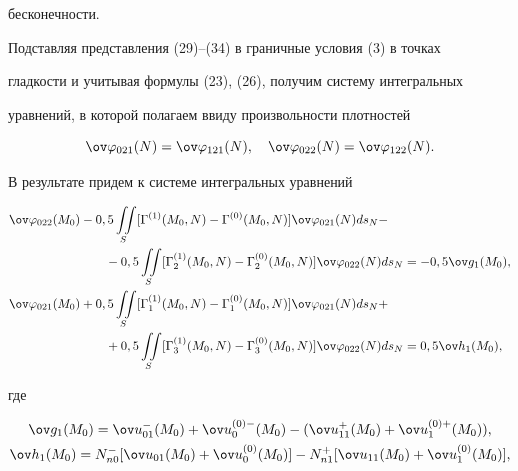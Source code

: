 \begin{pf}
бесконечности. 


 


Подставляя представления (29)--(34) в граничные условия (3) в точках  


гладкости и учитывая формулы (23), (26), получим систему интегральных  


уравнений, в которой полагаем ввиду произвольности плотностей 


$$ 


\ov\varphi_{021}(N)=\ov\varphi_{121}(N),\quad 


\ov\varphi_{022}(N)=\ov\varphi_{122}(N). 


$$ 


В результате придем к системе интегральных уравнений 


\begin{align} 


\ov\varphi_{022}(M_0)&-0,5\iint\limits_S[\Gamma^{(1)}(M_0,N)- 


\Gamma^{(0)}(M_0,N)]\ov\varphi_{021}(N)ds_N- \notag \\


% 


&\qquad-0,5\iint\limits_S[\Gamma^{(1)}_2(M_0,N)-\Gamma^{(0)}_2 


(M_0,N)]\ov\varphi_{022}(N)ds_N=-0,5\ov g_1(M_0),\notag \\ 


% 


\ov\varphi_{021}(M_0)&+0,5\iint\limits_S[\Gamma^{(1)}_1(M_0,N)- 


\Gamma^{(0)}_1(M_0,N)]\ov\varphi_{021}(N)ds_N+ \notag \\


% 


&\qquad+0,5\iint\limits_S[\Gamma^{(1)}_3(M_0,N)-\Gamma^{(0)}_3 


(M_0,N)]\ov\varphi_{022}(N)ds_N=0,5\ov h_1(M_0),\end{align} 


где 


\begin{gather*} 


\ov g_1(M_0)=\ov u{}^-_{01}(M_0)+\ov u{}^{(0)-}_0(M_0)- 


(\ov u{}^+_{11}(M_0)+\ov u{}^{(0)+}_1(M_0)), \\ 


\ov h_1(M_0)=N^-_{n0}[\ov u_{01}(M_0)+\ov u{}^{(0)}_0(M_0)]- 


N^+_{n1}[\ov u_{11}(M_0)+\ov u{}^{(0)}_1(M_0)], 



\end{gather*}
\end{pf}
